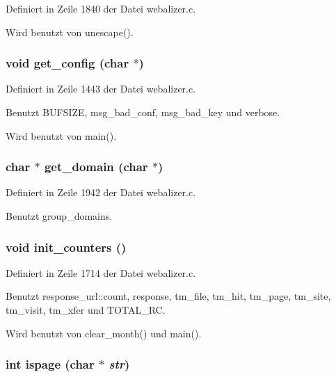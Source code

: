 Definiert in Zeile 1840 der Datei webalizer.c.

Wird benutzt von unescape().
\subsubsection{\setlength{\rightskip}{0pt plus 5cm}void get\_\-config (char $\ast$)}\label{webalizer_8c_7e50c67e6aba9c0c3025c04b0a7aedc4}




Definiert in Zeile 1443 der Datei webalizer.c.

Benutzt BUFSIZE, msg\_\-bad\_\-conf, msg\_\-bad\_\-key und verbose.

Wird benutzt von main().
\subsubsection{\setlength{\rightskip}{0pt plus 5cm}char $\ast$ get\_\-domain (char $\ast$)}\label{webalizer_8c_4c24c3d81b9c48e9f490919de3e32afb}




Definiert in Zeile 1942 der Datei webalizer.c.

Benutzt group\_\-domains.
\subsubsection{\setlength{\rightskip}{0pt plus 5cm}void init\_\-counters ()}\label{webalizer_8c_c13990c5857877d516d60af22bfbc492}




Definiert in Zeile 1714 der Datei webalizer.c.

Benutzt response\_\-url::count, response, tm\_\-file, tm\_\-hit, tm\_\-page, tm\_\-site, tm\_\-visit, tm\_\-xfer und TOTAL\_\-RC.

Wird benutzt von clear\_\-month() und main().
\subsubsection{\setlength{\rightskip}{0pt plus 5cm}int ispage (char $\ast$ {\em str})}\label{webalizer_8c_875f50fc519d72b2f46b8413cb1a9c45}




